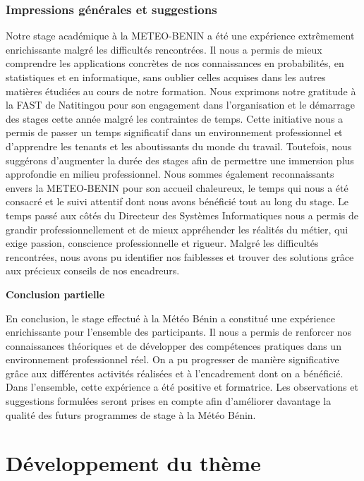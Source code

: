 \documentclass[a4paper,12pt]{report}
\theoremstyle{definition}
\begin{document}
	\section{Impressions générales et suggestions}
	Notre stage académique à la METEO-BENIN a été une expérience extrêmement enrichissante malgré les difficultés rencontrées. Il nous a permis de mieux comprendre les applications concrètes de nos connaissances en probabilités, en statistiques et en informatique, sans oublier celles acquises dans les autres matières étudiées au cours de notre formation. Nous exprimons notre gratitude à la FAST de Natitingou pour son engagement dans l'organisation et le démarrage des stages cette année malgré les contraintes de temps. Cette initiative nous a permis de passer un temps significatif dans un environnement professionnel et d'apprendre les tenants et les aboutissants du monde du travail. Toutefois, nous suggérons d'augmenter la durée des stages afin de permettre une immersion plus approfondie en milieu professionnel. Nous sommes également reconnaissants envers la  METEO-BENIN  pour son accueil chaleureux, le temps qui nous a été consacré et le suivi attentif dont nous avons bénéficié tout au long du stage. Le temps passé aux côtés du Directeur des Systèmes Informatiques nous a permis de grandir professionnellement et de mieux appréhender les réalités du métier, qui exige passion, conscience professionnelle et rigueur. Malgré les difficultés rencontrées, nous avons pu identifier nos faiblesses et trouver des solutions grâce aux précieux conseils de nos encadreurs.
	\newline
	\newline
	\begin{center}
		\textbf{{\LARGE Conclusion partielle}}
	\end{center}
	
	En conclusion, le stage effectué à la Météo Bénin a constitué une expérience enrichissante pour l’ensemble des participants. Il nous a permis de renforcer nos connaissances théoriques et de développer des compétences pratiques dans un environnement professionnel réel. On a pu progresser de manière significative grâce aux différentes activités réalisées et à l’encadrement dont on a bénéficié. Dans l’ensemble, cette expérience a été positive et formatrice. Les observations et suggestions formulées seront prises en compte afin d’améliorer davantage la qualité des futurs programmes de stage à la Météo Bénin.
	
	
	\part{Développement du thème}
	\setcounter{section}{0}
	
\end{document}
